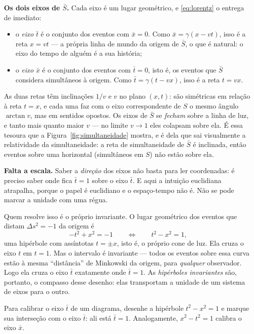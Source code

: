 \documentclass[12pt,a4paper,oneside]{book}
\theoremstyle{rgplain}
\theoremstyle{rgremark}
\begin{document}
\textbf{Os dois eixos de $\bar S$.} Cada eixo é um lugar geométrico, e
\eqref{eq:lorentz} o entrega de imediato:
\begin{itemize}
  \item o \emph{eixo $\bar t$} é o conjunto dos eventos com $\bar x=0$. Como
  $\bar x=\gamma(x-vt)$, isso é a reta $x=vt$ --- a própria linha de mundo da
  origem de $\bar S$, o que é natural: o eixo do tempo de alguém é a sua
  história;
  \item o \emph{eixo $\bar x$} é o conjunto dos eventos com $\bar t=0$, isto é, os
  eventos que $\bar S$ considera simultâneos à origem. Como $\bar t=\gamma(t-vx)$,
  isso é a reta $t=vx$.
\end{itemize}
As duas retas têm inclinações $1/v$ e $v$ no plano $(x,t)$: são simétricas em
relação à reta $t=x$, e cada uma faz com o eixo correspondente de $S$ o mesmo
ângulo $\arctan v$, mas em sentidos opostos. Os eixos de $\bar S$ se \emph{fecham}
sobre a linha de luz, e tanto mais quanto maior $v$ --- no limite $v\to1$ eles
colapsam sobre ela. É essa tesoura que a Figura~\ref{fig:simultaneidade}
mostra, e é dela que sai visualmente a relatividade da simultaneidade: a reta
de simultaneidade de $\bar S$ é inclinada, então eventos sobre uma horizontal
(simultâneos em $S$) não estão sobre ela.

\textbf{Falta a escala.} Saber a \emph{direção} dos eixos não basta para ler
coordenadas: é preciso saber onde fica $\bar t=1$ sobre o eixo $\bar t$. E aqui a
intuição euclidiana atrapalha, porque o papel é euclidiano e o espaço-tempo
não é. Não se pode marcar a unidade com uma régua.

Quem resolve isso é o próprio invariante. O lugar geométrico dos eventos que
distam $\Delta s^2=-1$ da origem é
\[
  -t^2+x^2=-1
  \qquad\Longleftrightarrow\qquad
  t^2-x^2=1 ,
\]
uma hipérbole com assíntotas $t=\pm x$, isto é, o próprio cone de luz. Ela
cruza o eixo $t$ em $t=1$. Mas o intervalo é invariante --- todos os eventos
sobre essa curva estão à mesma ``distância'' de Minkowski da origem, para
\emph{qualquer} observador. Logo ela cruza o eixo $\bar t$ exatamente onde
$\bar t=1$. As \emph{hipérboles invariantes} são, portanto, o compasso desse
desenho: elas transportam a unidade de um sistema de eixos para o outro.

\begin{resultado}
Para calibrar o eixo $\bar t$ de um diagrama, desenhe a hipérbole $t^2-x^2=1$ e
marque sua interseção com o eixo $\bar t$: ali está $\bar t=1$. Analogamente,
$x^2-t^2=1$ calibra o eixo $\bar x$.
\end{resultado}
\end{document}
